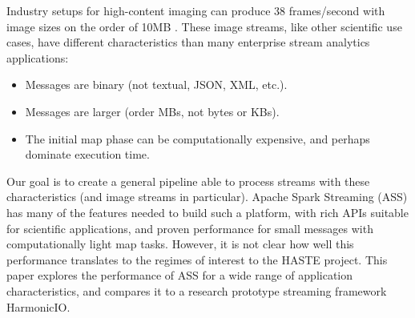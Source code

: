 \documentclass[conference]{IEEEtran}
\begin{document}
Industry setups for high-content imaging can produce 38 frames/second with image sizes on the order of 10MB \cite{lugnegaard2018building}. 
These image streams, like other scientific use cases, have different characteristics than many enterprise stream analytics applications: %


\begin{itemize}
\item Messages are binary (not textual, JSON, XML, etc.).
\item Messages are larger (order MBs, not bytes or KBs).
\item The initial map phase can be computationally expensive, and perhaps dominate execution time.
\end{itemize}



Our goal is to create a general pipeline able to process streams with these characteristics (and image streams in particular).
Apache Spark Streaming (ASS) has many of the features needed to build such a platform, with rich APIs suitable for scientific applications, and proven performance for small messages with computationally light map tasks. However, it is not clear how well this performance translates to the regimes of interest to the HASTE project. This paper explores the performance of ASS for a wide range of application characteristics, and compares it to a research prototype streaming framework HarmonicIO. %
\end{document}

